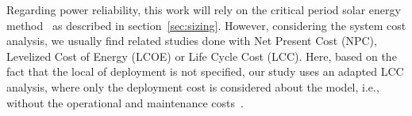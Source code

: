 \documentclass[10pt,conference]{IEEEtran}
\begin{document}
Regarding power reliability, this work will rely on the critical period solar energy method~\cite{Pinho} as described in section~\ref{sec:sizing}. 
However, considering the system cost analysis, we usually find related studies done with Net Present Cost (NPC), Levelized Cost of Energy (LCOE) or Life Cycle Cost (LCC). Here, based on the fact that the local of deployment is not specified, our study uses an adapted LCC analysis, where only the deployment cost is considered about the model, i.e., without the operational and maintenance costs~\cite{Alsadi2018}.
\end{document}
